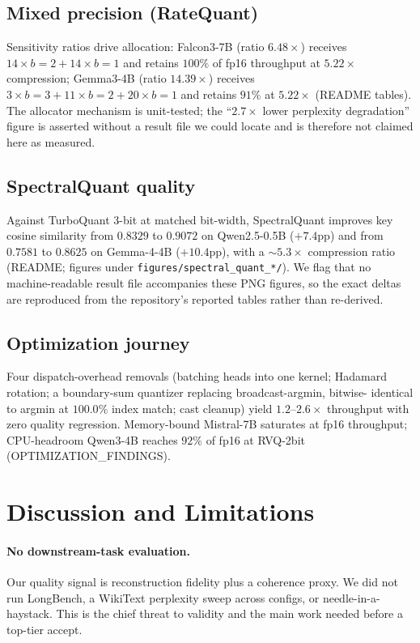 \documentclass[11pt]{article}
\begin{document}
\subsection{Mixed precision (RateQuant)}
Sensitivity ratios drive allocation: Falcon3-7B (ratio $6.48\times$) receives
$14{\times}b{=}2 + 14{\times}b{=}1$ and retains $100\%$ of fp16 throughput at
$5.22\times$ compression; Gemma3-4B (ratio $14.39\times$) receives
$3{\times}b{=}3 + 11{\times}b{=}2 + 20{\times}b{=}1$ and retains $91\%$ at
$5.22\times$ (README tables). The allocator mechanism is unit-tested; the
``$2.7\times$ lower perplexity degradation'' figure is asserted without a
result file we could locate and is therefore not claimed here as measured.

\subsection{SpectralQuant quality}
Against TurboQuant 3-bit at matched bit-width, SpectralQuant improves key
cosine similarity from $0.8329$ to $0.9072$ on Qwen2.5-0.5B ($+7.4$pp) and
from $0.7581$ to $0.8625$ on Gemma-4-4B ($+10.4$pp), with a $\sim\!5.3\times$
compression ratio (README; figures under \texttt{figures/spectral\_quant\_*/}).
We flag that no machine-readable result file accompanies these PNG figures, so
the exact deltas are reproduced from the repository's reported tables rather
than re-derived.

\subsection{Optimization journey}
Four dispatch-overhead removals (batching heads into one kernel; Hadamard
rotation; a boundary-sum quantizer replacing broadcast-argmin, bitwise-
identical to argmin at $100.0\%$ index match; cast cleanup) yield
$1.2$--$2.6\times$ throughput with zero quality regression. Memory-bound
Mistral-7B saturates at fp16 throughput; CPU-headroom Qwen3-4B reaches $92\%$
of fp16 at RVQ-2bit (OPTIMIZATION\_FINDINGS).

\section{Discussion and Limitations}
\label{sec:limits}
\paragraph{No downstream-task evaluation.} Our quality signal is
reconstruction fidelity plus a coherence proxy. We did not run LongBench, a
WikiText perplexity sweep across configs, or needle-in-a-haystack. This is the
chief threat to validity and the main work needed before a top-tier accept.
\end{document}

